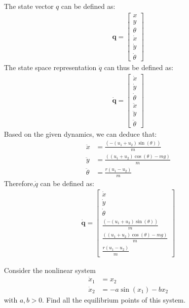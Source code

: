 \begin{answer}
    The state vector $q$ can be defined as:
	\begin{align*}    
    \mathbf{q} = \begin{bmatrix} x \\ y \\ \theta \\ \dot{x} \\ \dot{y} \\ \dot{\theta} \end{bmatrix}
    \end{align*}
    The state space representation $\dot{q}$ can thus be defined as:
    \begin{align*}   
    \mathbf{\dot{q}} = \begin{bmatrix} \dot{x} \\ \dot{y} \\ \dot{\theta} \\ \ddot{x} \\ \ddot{y} \\ \ddot{\theta} \end{bmatrix}
    \end{align*}
    Based on the given dynamics, we can deduce that:
    \begin{align*}
        \ddot{x} &= {\frac{(- (u_1+u_2) \sin{(\theta)})}{m}} \\
        \ddot{y} &= {\frac{((u_1+u_2)\cos{(\theta)}-mg)}{m}} \\
        \ddot{\theta} &= {\frac{r(u_1-u_2)}{m}}
    \end{align*}
    Therefore,$\dot{q}$ can be defined as:
    \begin{align*}   
    \mathbf{\dot{q}} = \begin{bmatrix} \dot{x} \\ \dot{y} \\ \dot{\theta} \\ {\frac{(- (u_1+u_2) \sin{(\theta)})}{m}} \\ {\frac{((u_1+u_2)\cos{(\theta)}-mg)}{m}} \\ {\frac{r(u_1-u_2)}{m}} \end{bmatrix}
    \end{align*}
\end{answer}

\begin{problem}[10]
    Consider the nonlinear system
    \begin{align*}
        \dot{x}_1 &= x_2 \\
        \dot{x}_2 & = -a \sin{(x_1)} - bx_2
    \end{align*}
    with $a,b>0$.
    Find all the equilibrium points of this system.
\end{problem}

